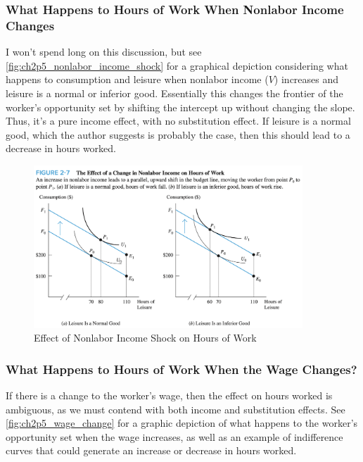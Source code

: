 \subsubsection{What Happens to Hours of Work When Nonlabor Income Changes}

I won't spend long on this discussion, but see 
\autoref{fig:ch2p5_nonlabor_income_shock}
for a graphical depiction considering what happens
to consumption and leisure when nonlabor income ($V$) increases
and leisure is a normal or inferior good. 
Essentially this changes the frontier of the 
worker's opportunity set by shifting the intercept up 
without changing the slope.
Thus, it's a pure income effect, with no 
substitution effect.
If leisure is a normal good, which the author
suggests is probably the case, then this should 
lead to a decrease in hours worked.

\FloatBarrier

\begin{figure}[!htb]
    \centering
        \includegraphics[width=0.9\textwidth]{../input/ch_2p5_nonlabor_income_shock.png}
    \caption{Effect of Nonlabor Income Shock on Hours of Work}
    \label{fig:ch2p5_nonlabor_income_shock}
\end{figure}

\FloatBarrier

\subsubsection{What Happens to Hours of Work When the Wage Changes?}

If there is a change to the worker's wage, then the effect
on hours worked is ambiguous, as we must contend 
with both income and substitution effects.
See \autoref{fig:ch2p5_wage_change}
for a graphic depiction of what happens to the 
worker's opportunity set when the wage increases,
as well as an example of indifference curves 
that could generate an increase or decrease in hours worked.

